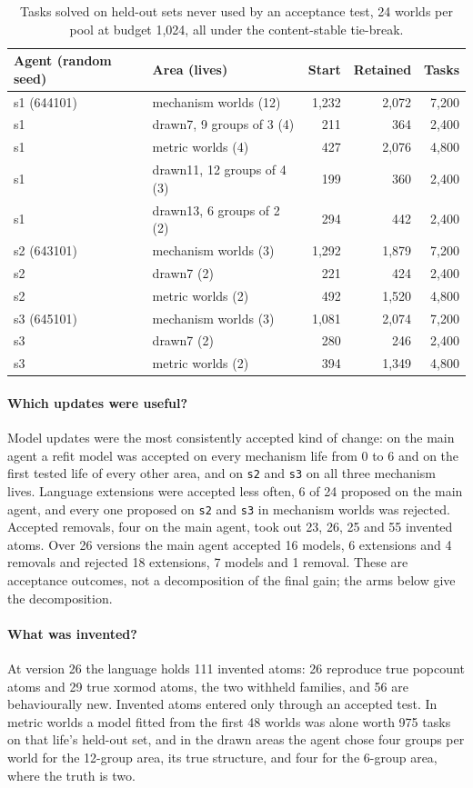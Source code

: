 \documentclass[11pt]{article}
\begin{document}
\begin{table}[t]
\centering
\caption{Tasks solved on held-out sets never used by an acceptance test, 24 worlds per pool at budget 1,024, all under the content-stable tie-break.}
\label{tab:growth}
\begin{tabular}{llrrr}
\toprule
Agent (random seed) & Area (lives) & Start & Retained & Tasks \\
\midrule
s1 (644101) & mechanism worlds (12) & 1,232 & 2,072 & 7,200 \\
s1 & drawn7, 9 groups of 3 (4) & 211 & 364 & 2,400 \\
s1 & metric worlds (4) & 427 & 2,076 & 4,800 \\
s1 & drawn11, 12 groups of 4 (3) & 199 & 360 & 2,400 \\
s1 & drawn13, 6 groups of 2 (2) & 294 & 442 & 2,400 \\
s2 (643101) & mechanism worlds (3) & 1,292 & 1,879 & 7,200 \\
s2 & drawn7 (2) & 221 & 424 & 2,400 \\
s2 & metric worlds (2) & 492 & 1,520 & 4,800 \\
s3 (645101) & mechanism worlds (3) & 1,081 & 2,074 & 7,200 \\
s3 & drawn7 (2) & 280 & 246 & 2,400 \\
s3 & metric worlds (2) & 394 & 1,349 & 4,800 \\
\bottomrule
\end{tabular}
\end{table}

\paragraph{Which updates were useful?} Model updates were the most consistently accepted kind of change: on the main agent a refit model was accepted on every mechanism life from 0 to 6 and on the first tested life of every other area, and on \texttt{s2} and \texttt{s3} on all three mechanism lives. Language extensions were accepted less often, 6 of 24 proposed on the main agent, and every one proposed on \texttt{s2} and \texttt{s3} in mechanism worlds was rejected. Accepted removals, four on the main agent, took out 23, 26, 25 and 55 invented atoms. Over 26 versions the main agent accepted 16 models, 6 extensions and 4 removals and rejected 18 extensions, 7 models and 1 removal. These are acceptance outcomes, not a decomposition of the final gain; the arms below give the decomposition.

\paragraph{What was invented?} At version 26 the language holds 111 invented atoms: 26 reproduce true popcount atoms and 29 true xormod atoms, the two withheld families, and 56 are behaviourally new. Invented atoms entered only through an accepted test. In metric worlds a model fitted from the first 48 worlds was alone worth 975 tasks on that life's held-out set, and in the drawn areas the agent chose four groups per world for the 12-group area, its true structure, and four for the 6-group area, where the truth is two.
\end{document}
